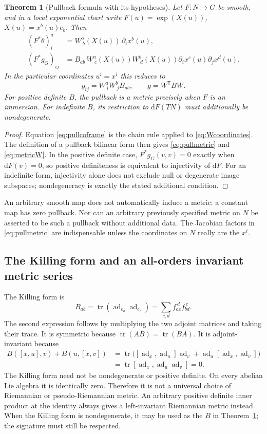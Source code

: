 \documentclass[11pt]{article}
\newtheorem{theorem}{Theorem}[section]
\theoremstyle{definition}
\theoremstyle{remark}
\newcommand{\dd}{\mathrm d}
\newcommand{\ad}{\operatorname{ad}}
\newcommand{\tr}{\operatorname{tr}}
\numberwithin{equation}{section}
\begin{document}
\begin{theorem}[Pullback formula with its hypotheses]\label{thm:pullback}
Let $F:N\to G$ be smooth, and in a local exponential chart write
$F(u)=\exp(X(u))$, $X(u)=x^b(u)e_b$. Then
\begin{align}
 (F^*\theta)^a_i&=W^a_{\ b}(X(u))\,\partial_i x^b(u),\label{eq:pullcoframe}\\
 (F^*g_G)_{ij}&=B_{ab}\,
   W^a_{\ c}(X(u))W^b_{\ d}(X(u))
   \partial_i x^c(u)\partial_j x^d(u).\label{eq:pullmetric}
\end{align}
In the particular coordinates $u^i=x^i$ this reduces to
\begin{equation}\label{eq:metricW}
 g_{ij}=W^a_{\ i}W^b_{\ j}B_{ab},\qquad g=W^{\mathsf T}BW.
\end{equation}
For positive definite $B$, the pullback is a metric precisely when $F$ is an immersion. For indefinite $B$, its restriction to $\dd F(TN)$ must additionally be nondegenerate.
\end{theorem}
\begin{proof}
Equation \eqref{eq:pullcoframe} is the chain rule applied to \eqref{eq:Wcoordinates}. The definition of a pullback bilinear form then gives \eqref{eq:pullmetric} and \eqref{eq:metricW}. In the positive definite case, $F^*g_G(v,v)=0$ exactly when $\dd F(v)=0$, so positive definiteness is equivalent to injectivity of $\dd F$. For an indefinite form, injectivity alone does not exclude null or degenerate image subspaces; nondegeneracy is exactly the stated additional condition.
\end{proof}
An arbitrary smooth map does not automatically induce a metric: a constant map has zero pullback. Nor can an arbitrary previously specified metric on $N$ be asserted to be such a pullback without additional data. The Jacobian factors in \eqref{eq:pullmetric} are indispensable unless the coordinates on $N$ really are the $x^i$.

\subsection{The Killing form and an all-orders invariant metric series}
The Killing form is
\begin{equation}\label{eq:killing}
 B_{ab}=\tr(\ad_{e_a}\ad_{e_b})
       =\sum_{c,d}f_{ac}^{\ d}f_{bd}^{\ c}.
\end{equation}
The second expression follows by multiplying the two adjoint matrices and taking their trace. It is symmetric because $\tr(AB)=\tr(BA)$. It is adjoint-invariant because
\begin{align*}
 B([x,u],v)+B(u,[x,v])
 &=\tr\bigl([\ad_x,\ad_u]\ad_v+
                      \ad_u[\ad_x,\ad_v]\bigr)\\
 &=\tr[\ad_x,\ad_u\ad_v]=0.
\end{align*}
The Killing form need not be nondegenerate or positive definite. On every abelian Lie algebra it is identically zero. Therefore it is not a universal choice of Riemannian or pseudo-Riemannian metric. An arbitrary positive definite inner product at the identity always gives a left-invariant Riemannian metric instead. When the Killing form is nondegenerate, it may be used as the $B$ in Theorem~\ref{thm:pullback}; the signature must still be respected.
\end{document}
